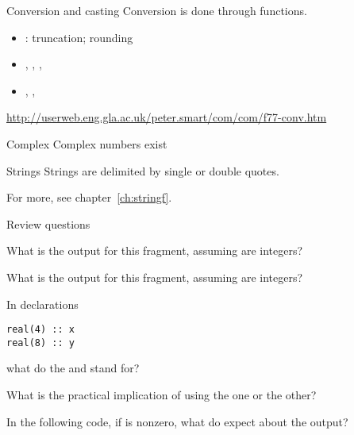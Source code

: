 \begin{block}{Conversion and casting}
  Conversion is done through functions.
  \begin{itemize}
  \item {}: truncation;  rounding
  \item {}, , , 
  \item {}, , 
  \end{itemize}
\url{http://userweb.eng.gla.ac.uk/peter.smart/com/com/f77-conv.htm}
\end{block}

\begin{block}{Complex}
  Complex numbers exist
\end{block}

\begin{block}{Strings}
  Strings are delimited by single or double quotes.

  For more, see chapter~\ref{ch:stringf}.
\end{block}

 {Review questions}

\begin{exercise}
  What is the output for this fragment, assuming  are integers?
\end{exercise}

\begin{exercise}
  What is the output for this fragment, assuming  are integers?
\end{exercise}

\begin{exercise}
  \label{ex:f-elt-rev1}
  In declarations
\begin{lstlisting}
real(4) :: x
real(8) :: y
\end{lstlisting}
what do the  and  stand for?

What is the practical implication of using the one or the other?
\end{exercise}

\begin{exercise}
  \label{ex:f-elt-rev2}
  In the following code, if  is nonzero, what do expect about
  the output?
\end{exercise}
